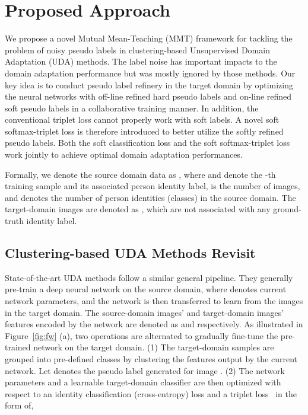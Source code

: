 \documentclass{article} \usepackage{iclr2020_conference,times}
\begin{document}
\section{Proposed Approach}
We propose a novel Mutual Mean-Teaching (MMT) framework for tackling the problem of noisy pseudo labels in clustering-based Unsupervised Domain Adaptation (UDA) methods. The label noise has important impacts to the domain adaptation performance but was mostly ignored by those methods. 
Our key idea is to conduct pseudo label refinery in the target domain by optimizing the neural networks with off-line refined hard pseudo labels and on-line refined soft pseudo labels in a collaborative training manner. 
In addition, the conventional triplet loss cannot properly work with soft labels. A novel soft softmax-triplet loss is therefore introduced to better utilize the softly refined pseudo labels.
Both the soft classification loss and the soft softmax-triplet loss work jointly to achieve optimal domain adaptation performances.


Formally, we denote the source domain data as , where  and  denote the -th training sample and its associated person identity label,  is the number of images, and  denotes the number of person identities (classes) in the source domain. The  target-domain images are denoted as , which are not associated with any ground-truth identity label.
\subsection{Clustering-based UDA Methods Revisit}
\label{sec:revisit}
\vspace{-5pt}



State-of-the-art UDA methods \citep{fan2018unsupervised,lin2019aBottom,zhang2019self,yang2019selfsimilarity} follow a similar general pipeline. They generally pre-train a deep neural network  on the source domain, where  denotes current network parameters,
and the network is then transferred to learn from the images in the target domain.  
The source-domain images' and target-domain images' features encoded by the network are denoted as  and  respectively. 
As illustrated in Figure~\ref{fig:fw} (a), 
two operations are alternated to gradually fine-tune the pre-trained network on the target domain. 
(1) The target-domain samples are grouped into pre-defined  classes by clustering the features  output by the current network. 
Let  denotes the pseudo label generated for image . 
(2) The network parameters  and a learnable target-domain classifier  
are then optimized with respect to an identity classification (cross-entropy) loss  and a triplet loss~\citep{hermans2017defense}  in the form of, {\small
}
\end{document}
